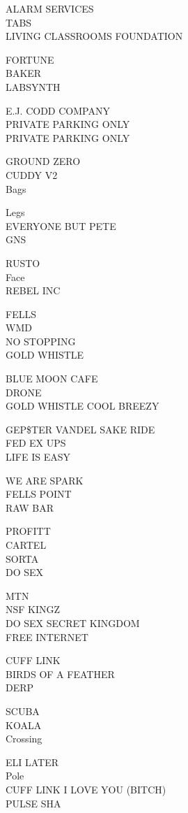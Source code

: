 \documentclass[10pt,letterpaper]{article}
\begin{document}
ALARM SERVICES\\
TABS\\
LIVING CLASSROOMS FOUNDATION

FORTUNE\\
BAKER\\
LABSYNTH

E.J. CODD COMPANY\\
PRIVATE PARKING ONLY\\
PRIVATE PARKING ONLY

GROUND ZERO\\
CUDDY V2\\
Bags

Legs\\
EVERYONE BUT PETE\\
GNS

RUSTO\\
Face\\
REBEL INC

FELLS\\
WMD\\
NO STOPPING\\
GOLD WHISTLE

BLUE MOON CAFE\\
DRONE\\
GOLD WHISTLE COOL BREEZY

GEP\$TER VANDEL SAKE RIDE\\
FED EX UPS\\
LIFE IS EASY

WE ARE SPARK\\
FELLS POINT\\
RAW BAR

PROFITT\\
CARTEL\\
SORTA\\
DO SEX

MTN\\
NSF KINGZ\\
DO SEX SECRET KINGDOM\\
FREE INTERNET

CUFF LINK\\
BIRDS OF A FEATHER\\
DERP

SCUBA\\
KOALA\\
Crossing

ELI LATER\\
Pole\\
CUFF LINK I LOVE YOU (BITCH)\\
PULSE SHA
\end{document}
